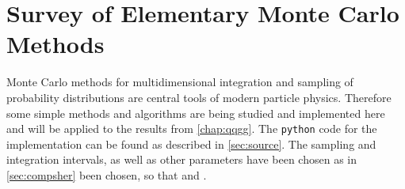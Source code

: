
\chapter{Survey of Elementary Monte Carlo Methods}%
\label{chap:mc}

Monte Carlo methods for multidimensional integration and sampling of
probability distributions are central tools of modern particle
physics. Therefore some simple methods and algorithms are being
studied and implemented here and will be applied to the results from
\cref{chap:qqgg}. The \verb|python| code for the implementation can be
found as described in \cref{sec:source}. The sampling and integration
intervals, as well as other parameters have been chosen as in
\cref{sec:compsher} been chosen, so that  and
\!.
